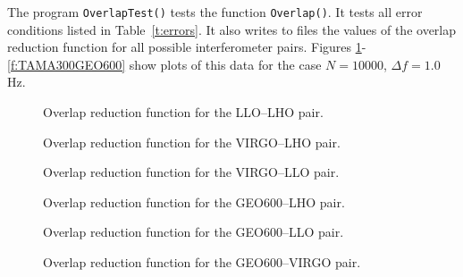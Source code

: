 \documentclass{article}
\begin{document}
The program {\tt OverlapTest()\/} tests the function {\tt Overlap()\/}.  
It tests all error conditions listed in Table~\ref{t:errors}.  
It also writes to files the values of the overlap reduction function
for all possible interferometer pairs.
Figures \ref{f:LLOLHO}-\ref{f:TAMA300GEO600} show plots of this data
for the case $N=10000$, $\Delta f= 1.0$ Hz.
%
\begin{figure}[htb!]
\begin{center}
{}
\caption{\label{f:LLOLHO}
Overlap reduction function for the LLO--LHO pair.}
\end{center}
\end{figure}
%
%
\begin{figure}[htb!]
\begin{center}
{}
\caption{\label{f:VIRGOLHO}
Overlap reduction function for the VIRGO--LHO pair.}
\end{center}
\end{figure}
%
%
\begin{figure}[htb!]
\begin{center}
{}
\caption{\label{f:VIRGOLLO}
Overlap reduction function for the VIRGO--LLO pair.}
\end{center}
\end{figure}
%
%
\begin{figure}[htb!]
\begin{center}
{}
\caption{\label{f:GEO600LHO}
Overlap reduction function for the GEO600--LHO pair.}
\end{center}
\end{figure}
%
%
\begin{figure}[htb!]
\begin{center}
{}
\caption{\label{f:GEO600LLO}
Overlap reduction function for the GEO600--LLO pair.}
\end{center}
\end{figure}
%
%
\begin{figure}[htb!]
\begin{center}
{}
\caption{\label{f:GEO600VIRGO}
Overlap reduction function for the GEO600--VIRGO pair.}
\end{center}
\end{figure}
\end{document}
